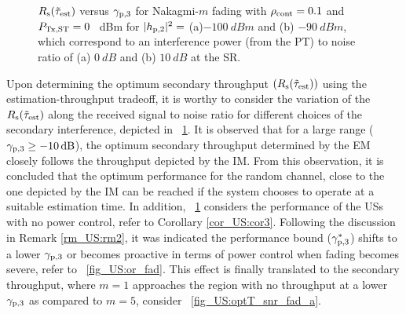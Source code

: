 \begin{figure}[!ht]
{
\label{fig_US:optT_snr_fad_b}
}
\vspace{-2mm}
\caption{$R_{\text{s}}(\tilde{\tau}_{\text{est}})$ versus ${\gamma}_{\text{p,3}}$ for Nakagmi-$m$ fading with $\rho_{\text{cont}} = 0.1$ and $P_{\text{Tx,ST}} = 0$ \SI{}{dBm} for $|h_{\text{p,2}}|^2 =$ (a)$\SI{-100}{dBm}$ and (b) $ \SI{-90}{dBm}$, which correspond to an interference power (from the PT) to noise ratio of (a) $\SI{0}{dB}$ and (b) $\SI{10}{dB}$ at the SR.}
\label{fig_US:optT_snr_fad}
\end{figure}

Upon determining the optimum secondary throughput $(R_{\text{s}}(\tilde{\tau}_{\text{est}}))$ using the estimation-throughput tradeoff, it is worthy to consider the variation of the $R_{\text{s}}(\tilde{\tau}_{\text{est}})$ along the received signal to noise ratio for different choices of the secondary interference, depicted in \figurename~\ref{fig_US:optT_snr_fad}. It is observed that for a large range (${\gamma}_{\text{p,3}} \ge \SI{-10}{dB}$), the optimum secondary throughput determined by the EM closely follows the throughput depicted by the IM. From this observation, it is concluded that the optimum performance for the random channel, close to the one depicted by the IM can be reached if the system chooses to operate at a suitable estimation time. In addition, \figurename~\ref{fig_US:optT_snr_fad} considers the performance of the USs with no power control, refer to Corollary \ref{cor_US:cor3}. Following the discussion in Remark \ref{rm_US:rm2}, it was indicated the performance bound (${\gamma}_{\text{p,3}}^*$) shifts to a lower ${\gamma}_{\text{p,3}}$ or becomes proactive in terms of power control when fading becomes severe, refer to \figurename~\ref{fig_US:or_fad}. This effect is finally translated to the secondary throughput, where $m = 1$ approaches the region with no throughput at a lower ${\gamma}_{\text{p,3}}$ as compared to $m = 5$, consider \figurename~\ref{fig_US:optT_snr_fad_a}. 
